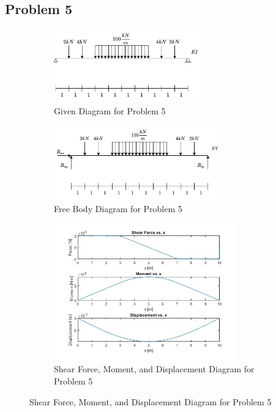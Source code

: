 \documentclass[a4paper]{article}
\begin{document}
\subsection{Problem 5}
\begin{figure}[H]
\centering
   \begin{subfigure}[b]{\textwidth}
   \centering
   \includegraphics[width=0.7\textwidth]{problems/prob_5.jpg}
   \caption{Given Diagram for Problem 5}
   \label{prob5:prob} 
\end{subfigure}
\begin{subfigure}[b]{\textwidth}
   \centering   
   \includegraphics[width=0.8\textwidth]{FBD/FBD_5.jpg}
   \caption{Free Body Diagram for Problem 5}
   \label{prob5:FBD}
\end{subfigure}
\begin{subfigure}[b]{\textwidth}
   \centering   
   \includegraphics[width=0.87\textwidth]{results/solution_5.jpg}
   \caption{Shear Force, Moment, and Displacement Diagram for Problem 5}
   \label{prob5:results}
\end{subfigure}
\label{prob5}
\end{figure}
\end{document}
